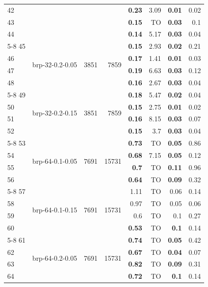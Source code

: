 \begin{longtable}{lrr@{\hskip 12pt}r@{\hskip 12pt}r@{\hskip 12pt}r@{\hskip 12pt}r@{\hskip 12pt}r}
42 &  &  &  & \textbf{0.23} & 3.09 & \textbf{0.01} & 0.02 \\
43 &  &  &  & \textbf{0.15} & TO & \textbf{0.03} & 0.1 \\
44 &  &  &  & \textbf{0.14} & 5.17 & \textbf{0.03} & 0.04 \\
\cmidrule{5-8}
45 & \multirow{4}{*}{brp-32-0.2-0.05} & \multirow{4}{*}{3851} & \multirow{4}{*}{7859} & \textbf{0.15} & 2.93 & \textbf{0.02} & 0.21 \\
46 &  &  &  & \textbf{0.17} & 1.41 & \textbf{0.01} & 0.03 \\
47 &  &  &  & \textbf{0.19} & 6.63 & \textbf{0.03} & 0.12 \\
48 &  &  &  & \textbf{0.16} & 2.67 & \textbf{0.03} & 0.04 \\
\cmidrule{5-8}
49 & \multirow{4}{*}{brp-32-0.2-0.15} & \multirow{4}{*}{3851} & \multirow{4}{*}{7859} & \textbf{0.18} & 5.47 & \textbf{0.02} & 0.04 \\
50 &  &  &  & \textbf{0.15} & 2.75 & \textbf{0.01} & 0.02 \\
51 &  &  &  & \textbf{0.16} & 8.15 & \textbf{0.03} & 0.07 \\
52 &  &  &  & \textbf{0.15} & 3.7 & \textbf{0.03} & 0.04 \\
\cmidrule{5-8}
53 & \multirow{4}{*}{brp-64-0.1-0.05} & \multirow{4}{*}{7691} & \multirow{4}{*}{15731} & \textbf{0.73} & TO & \textbf{0.05} & 0.86 \\
54 &  &  &  & \textbf{0.68} & 7.15 & \textbf{0.05} & 0.12 \\
55 &  &  &  & \textbf{0.7} & TO & \textbf{0.11} & 0.96 \\
56 &  &  &  & \textbf{0.64} & TO & \textbf{0.09} & 0.32 \\
\cmidrule{5-8}
57 & \multirow{4}{*}{brp-64-0.1-0.15} & \multirow{4}{*}{7691} & \multirow{4}{*}{15731} & 1.11 & TO & 0.06 & 0.14 \\
58 &  &  &  & 0.97 & TO & 0.05 & 0.06 \\
59 &  &  &  & 0.6 & TO & 0.1 & 0.27 \\
60 &  &  &  & \textbf{0.53} & TO & \textbf{0.1} & 0.14 \\
\cmidrule{5-8}
61 & \multirow{4}{*}{brp-64-0.2-0.05} & \multirow{4}{*}{7691} & \multirow{4}{*}{15731} & \textbf{0.74} & TO & \textbf{0.05} & 0.42 \\
62 &  &  &  & \textbf{0.67} & TO & \textbf{0.04} & 0.07 \\
63 &  &  &  & \textbf{0.82} & TO & \textbf{0.09} & 0.31 \\
64 &  &  &  & \textbf{0.72} & TO & \textbf{0.1} & 0.14 \\

\end{longtable}
